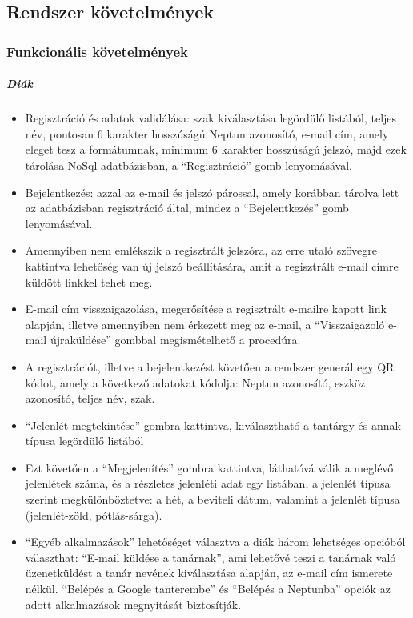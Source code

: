 \documentclass[12pt]{article}
\numberwithin{figure}{section}
\numberwithin{equation}{section}
\begin{document}
\subsection{Rendszer követelmények}
\subsubsection{Funkcionális követelmények}
\subparagraph*{Diák}
\begin{itemize}
	\item {Regisztráció és adatok validálása: szak kiválasztása legördülő listából, teljes név, pontosan 6 karakter hosszúságú Neptun azonosító, e-mail cím, amely eleget tesz a formátumnak, minimum 6 karakter hosszúságú jelszó, majd ezek tárolása NoSql adatbázisban, a \enquote{Regisztráció} gomb lenyomásával.}
	\item {Bejelentkezés: azzal az e-mail és jelszó párossal, amely korábban tárolva lett az adatbázisban regisztráció által, mindez a \enquote{Bejelentkezés} gomb lenyomásával.}
	\item{Amennyiben nem emlékszik a regisztrált jelszóra, az erre utaló szövegre kattintva lehetőség van új jelszó beállítására, amit a regisztrált e-mail címre küldött linkkel tehet meg.}
	\item {E-mail cím visszaigazolása, megerősítése a regisztrált e-mailre kapott link alapján, illetve amennyiben nem érkezett meg az e-mail, a \enquote{Visszaigazoló e-mail újraküldése} gombbal megismételhető a procedúra.}
	\item {A regisztrációt, illetve a bejelentkezést követően a rendszer generál egy QR kódot, amely a következő adatokat kódolja: Neptun azonosító, eszköz azonosító, teljes név, szak.}
	\item {\enquote{Jelenlét megtekintése} gombra kattintva, kiválasztható a tantárgy és annak típusa legördülő listából}
	\item{Ezt követően a \enquote{Megjelenítés} gombra kattintva, láthatóvá válik a meglévő jelenlétek száma, és a részletes jelenléti adat egy listában, a jelenlét típusa szerint megkülönböztetve: a hét, a beviteli dátum, valamint a jelenlét típusa (jelenlét-zöld, pótlás-sárga).}
	\item {\enquote{Egyéb alkalmazások} lehetőséget választva a diák három lehetséges opcióból választhat: \enquote{E-mail küldése a tanárnak}, ami lehetővé teszi a tanárnak való üzenetküldést a tanár nevének kiválasztása alapján, az e-mail cím ismerete nélkül. \enquote{Belépés a Google tanterembe} és \enquote{Belépés a Neptunba} opciók az adott alkalmazások megnyitását biztosítják.}\\
\end{itemize}
\end{document}
